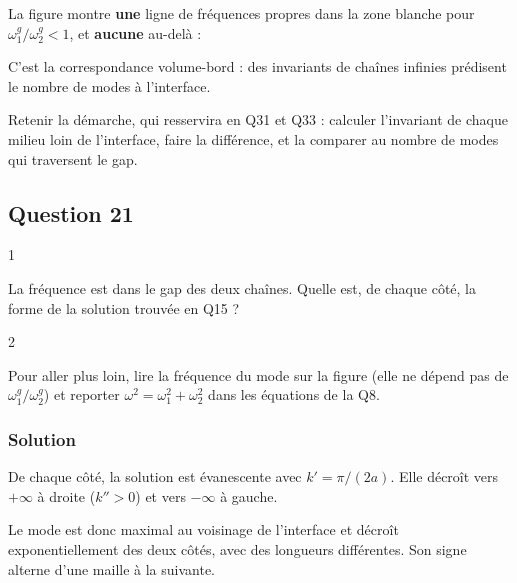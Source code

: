 \documentclass[11pt,a4paper]{article}
\newcommand{\equationajustee}[1]{%
  \sbox{\boiteequation}{$\displaystyle #1$}%
  \ifdim\wd\boiteequation>\linewidth
    \[\resizebox{\linewidth}{!}{\usebox{\boiteequation}}\]%
  \else
    \[#1\]%
  \fi}
\begin{document}
La figure montre \textbf{une} ligne de fréquences propres dans la zone blanche pour \(\omega_1^g/\omega_2^g<1\), et \textbf{aucune} au-delà :

\equationajustee{\boxed{N_{\text{gap}}=\lvert\nu_g-\nu_d\rvert}}

C'est la correspondance volume-bord : des invariants de chaînes infinies prédisent le nombre de modes à l'interface.

\begin{methode}

Retenir la démarche, qui resservira en Q31 et Q33 : calculer l'invariant de chaque milieu loin de l'interface, faire la différence, et la comparer au nombre de modes qui traversent le gap.

\end{methode}

\hypertarget{question-21}{%
\subsection{Question 21}\label{question-21}}

\begin{indication}{1}

La fréquence est dans le gap des deux chaînes. Quelle est, de chaque côté, la forme de la solution trouvée en Q15 ?

\end{indication}

\begin{indication}{2}

Pour aller plus loin, lire la fréquence du mode sur la figure (elle ne dépend pas de \(\omega_1^g/\omega_2^g\)) et reporter \(\omega^2=\omega_1^2+\omega_2^2\) dans les équations de la Q8.

\end{indication}

\hypertarget{solution-29}{%
\subsubsection{Solution}\label{solution-29}}

De chaque côté, la solution est évanescente avec \(k'=\pi/(2a)\). Elle décroît vers \(+\infty\) à droite (\(k''>0\)) et vers \(-\infty\) à gauche.

Le mode est donc maximal au voisinage de l'interface et décroît exponentiellement des deux côtés, avec des longueurs différentes. Son signe alterne d'une maille à la suivante.
\end{document}
